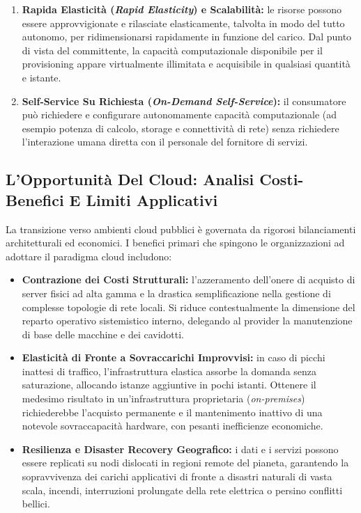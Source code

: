 \documentclass[11pt, a4paper]{article}
\begin{document}
\begin{enumerate}
    \item \textbf{Rapida Elasticità (\emph{Rapid Elasticity}) e Scalabilità:} le risorse possono essere approvvigionate e rilasciate elasticamente, talvolta in modo del tutto autonomo, per ridimensionarsi rapidamente in funzione del carico. Dal punto di vista del committente, la capacità computazionale disponibile per il provisioning appare virtualmente illimitata e acquisibile in qualsiasi quantità e istante.

    \item \textbf{Self-Service Su Richiesta (\emph{On-Demand Self-Service}):} il consumatore può richiedere e configurare autonomamente capacità computazionale (ad esempio potenza di calcolo, storage e connettività di rete) senza richiedere l'interazione umana diretta con il personale del fornitore di servizi.
\end{enumerate}

\subsection{L'Opportunità Del Cloud: Analisi Costi-Benefici E Limiti Applicativi}

La transizione verso ambienti cloud pubblici è governata da rigorosi bilanciamenti architetturali ed economici. I benefici primari che spingono le organizzazioni ad adottare il paradigma cloud includono:

\begin{itemize}
    \item \textbf{Contrazione dei Costi Strutturali:} l'azzeramento dell'onere di acquisto di server fisici ad alta gamma e la drastica semplificazione nella gestione di complesse topologie di rete locali. Si riduce contestualmente la dimensione del reparto operativo sistemistico interno, delegando al provider la manutenzione di base delle macchine e dei cavidotti.
    \item \textbf{Elasticità di Fronte a Sovraccarichi Improvvisi:} in caso di picchi inattesi di traffico, l'infrastruttura elastica assorbe la domanda senza saturazione, allocando istanze aggiuntive in pochi istanti. Ottenere il medesimo risultato in un'infrastruttura proprietaria (\emph{on-premises}) richiederebbe l'acquisto permanente e il mantenimento inattivo di una notevole sovraccapacità hardware, con pesanti inefficienze economiche.
    \item \textbf{Resilienza e Disaster Recovery Geografico:} i dati e i servizi possono essere replicati su nodi dislocati in regioni remote del pianeta, garantendo la sopravvivenza dei carichi applicativi di fronte a disastri naturali di vasta scala, incendi, interruzioni prolungate della rete elettrica o persino conflitti bellici.
\end{itemize}
\end{document}
